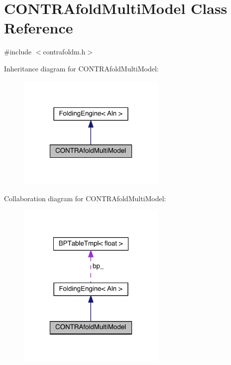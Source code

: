 \hypertarget{class_c_o_n_t_r_afold_multi_model}{\section{C\+O\+N\+T\+R\+Afold\+Multi\+Model Class Reference}
\label{class_c_o_n_t_r_afold_multi_model}
}


{\ttfamily \#include $<$contrafoldm.\+h$>$}



Inheritance diagram for C\+O\+N\+T\+R\+Afold\+Multi\+Model\+:
\nopagebreak
\begin{figure}[H]
\begin{center}
\leavevmode
\includegraphics[width=202pt]{class_c_o_n_t_r_afold_multi_model__inherit__graph}
\end{center}
\end{figure}


Collaboration diagram for C\+O\+N\+T\+R\+Afold\+Multi\+Model\+:
\nopagebreak
\begin{figure}[H]
\begin{center}
\leavevmode
\includegraphics[width=202pt]{class_c_o_n_t_r_afold_multi_model__coll__graph}
\end{center}
\end{figure}
